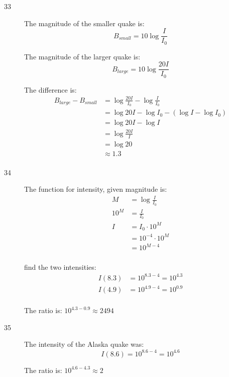 \documentclass{exam}
\begin{document}
\begin{description}
      \item[33]
        The magnitude of the smaller quake is:
        \[
          B_{small} = 10 \log \frac{I}{I_0}
        \]

        The magnitude of the larger quake is:
        \[
          B_{large} = 10 \log \frac{20 I}{I_0}
        \]

        The difference is:
        \begin{align*}
          B_{large} - B_{small} & = \log \frac{20 I}{I_0} - \log \frac{I}{I_0} \\
                                & = \log 20I - \log I_0 - ( \log I - \log I_0) \\
                                & = \log 20I - \log I \\
                                & = \log \frac{20I}{I} \\
                                & = \log 20 \\
                                & \approx \boxed{1.3} \\
        \end{align*}

      \pagebreak

      \item[34]
        The function for intensity, given magnitude is:
        \begin{align*}
          M    & = \log \frac{I}{I_0} \\
          10^M & = \frac{I}{I_0} \\
          I     & = I_0 \cdot 10^M \\
                & = 10^{-4} \cdot 10^M \\
                & = 10^{M - 4} \\
        \end{align*}

        find the two intensities:
        \begin{align*}
          I(8.3) &= 10^{8.3 - 4} = 10^{4.3} \\
          I(4.9) &= 10^{4.9 - 4} = 10^{0.9} \\
        \end{align*}

        The ratio is: $10^{4.3 - 0.9} \approx \boxed{2494}$ 

      \item[35]
        The intensity of the Alaska quake was:
        \[
          I(8.6) = 10^{8.6 - 4} = 10^{4.6}
        \]

        The ratio is: $10^{4.6 - 4.3} \approx \boxed{2}$ 


\end{description}
\end{document}
